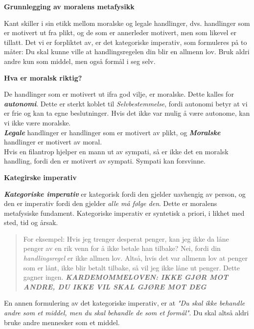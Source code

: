 \documentclass[11pt, a4paper]{article}
\newenvironment{sectionbox}[1][]{%
    \begin{sectionboxinner}
    \textbf{\large #1}
    \vspace{1pt}
    \newline
}{%
    \end{sectionboxinner}
}
\newenvironment{subsectionbox}[1][]{%
    \begin{subsectionboxinner}
    \textbf{#1}
    \vspace{3pt}
    \newline
}{%
    \end{subsectionboxinner}
}
\begin{document}
\begin{sectionbox}[Grunnlegging av moralens metafysikk]

Kant skiller i sin etikk mellom moralske og legale handlinger, dvs. handlinger som er motivert ut fra plikt, og de som er annerleder motivert, men som likevel er tillatt. Det vi er forpliktet av, er det kategoriske imperativ, som formuleres på to måter: Du skal kunne ville at handlingsregelen din blir en allmenn lov. Bruk aldri andre kun som middel, men også formål i seg selv.

\begin{subsectionbox}[Hva er moralsk riktig?]

De handlinger som er motivert ut ifra god vilje, er moralske. Dette kalles for \textbf{\textit{autonomi}}. Dette er sterkt koblet til \textit{Selvbestemmelse}, fordi autonomi betyr at vi er frie og kan ta egne beslutninger. Hvis det ikke var mulig å være autonome, kan vi ikke være moralske. \\

\textbf{\textit{Legale}} handlinger er handlinger som er motivert av plikt, og \textbf{\textit{Moralske}} handlinger er motivert av moral.\\

Hvis en filantrop hjelper en mann ut av sympati, så er ikke det en moralsk handling, fordi den er motivert av sympati. Sympati kan forsvinne.
\end{subsectionbox}

\begin{subsectionbox}[Kategirske imperativ]

\textbf{\textit{Kategoriske imperativ}} er kategorisk fordi den gjelder uavhengig av person, og den er imperativ fordi den gjelder \textit{alle må følge den}. Dette er moralens metafysiske fundament. Kategoriske imperativ er syntetisk a priori, i likhet med sted, tid og årsak. \\

\begin{quote}
    For eksempel: Hvis jeg trenger desperat penger, kan jeg ikke da låne penger av en rik venn for å ikke betale han tilbake? Nei, fordi din \textit{handlingsregel} er ikke allmen lov. Altså, hvis det var allmenn lov at penger som er lånt, ikke blir betalt tilbake, så vil jeg ikke låne ut penger. Dette gagner ingen. \textbf{\textit{KARDEMOMMELOVEN: IKKE GJØR MOT ANDRE, DU IKKE VIL SKAL GJØRE MOT DEG}}
\end{quote}

En annen formulering av det kategoriske imperativ, er at \textit{"Du skal ikke behandle andre som et middel, men du skal behandle de som et formål"}. Du skal altså aldri bruke andre mennesker som et middel.\\


\end{subsectionbox}
\end{sectionbox}
\end{document}
